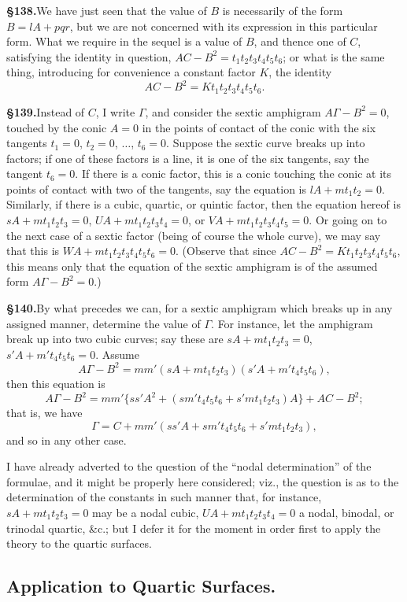 \documentclass[11pt,a4paper]{article}
\begin{document}
\textbf{\S 138.}\quad We have just seen that the value of $B$ is necessarily of the form $B = lA + pqr$, but we are not concerned with its expression in this particular form. What we require in the sequel is a value of $B$, and thence one of $C$, satisfying the identity in question, $AC - B^2 = t_1t_2t_3t_4t_5t_6$; or what is the same thing, introducing for convenience a constant factor $K$, the identity
\[
AC - B^2 = Kt_1t_2t_3t_4t_5t_6.
\]

\textbf{\S 139.}\quad Instead of $C$, I write $\Gamma$, and consider the sextic amphigram $A\Gamma - B^2 = 0$, touched by the conic $A = 0$ in the points of contact of the conic with the six tangents $t_1 = 0$, $t_2 = 0$, $\ldots$, $t_6 = 0$. Suppose the sextic curve breaks up into factors; if one of these factors is a line, it is one of the six tangents, say the tangent $t_6 = 0$. If there is a conic factor, this is a conic touching the conic at its points of contact with two of the tangents, say the equation is $lA + mt_1t_2 = 0$. Similarly, if there is a cubic, quartic, or quintic factor, then the equation hereof is $sA + mt_1t_2t_3 = 0$, $UA + mt_1t_2t_3t_4 = 0$, or $VA + mt_1t_2t_3t_4t_5 = 0$. Or going on to the next case of a sextic factor (being of course the whole curve), we may say that this is $WA + mt_1t_2t_3t_4t_5t_6 = 0$. (Observe that since $AC - B^2 = Kt_1t_2t_3t_4t_5t_6$, this means only that the equation of the sextic amphigram is of the assumed form $A\Gamma - B^2 = 0$.)

\textbf{\S 140.}\quad By what precedes we can, for a sextic amphigram which breaks up in any assigned manner, determine the value of $\Gamma$. For instance, let the amphigram break up into two cubic curves; say these are $sA + mt_1t_2t_3 = 0$, $s'A + m't_4t_5t_6 = 0$. Assume
\[
A\Gamma - B^2 = mm'(sA + mt_1t_2t_3)(s'A + m't_4t_5t_6),
\]
then this equation is
\[
A\Gamma - B^2 = mm'\{ss'A^2 + (sm't_4t_5t_6 + s'mt_1t_2t_3)A\} + AC - B^2;
\]
that is, we have
\[
\Gamma = C + mm'(ss'A + sm't_4t_5t_6 + s'mt_1t_2t_3),
\]
and so in any other case.

I have already adverted to the question of the ``nodal determination'' of the formulae, and it might be properly here considered; viz., the question is as to the determination of the constants in such manner that, for instance, $sA + mt_1t_2t_3 = 0$ may be a nodal cubic, $UA + mt_1t_2t_3t_4 = 0$ a nodal, binodal, or trinodal quartic, \&c.; but I defer it for the moment in order first to apply the theory to the quartic surfaces.

\subsection*{Application to Quartic Surfaces.}
\end{document}
